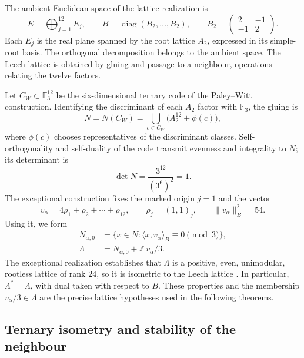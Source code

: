 The ambient Euclidean space of the lattice realization is
\begin{equation}
 E=\bigoplus_{j=1}^{12}E_j,\qquad
 B=\operatorname{diag}(B_2,\ldots,B_2),\qquad
 B_2=\begin{pmatrix}2&-1\\-1&2\end{pmatrix}.
 \label{eq:leech-ambient}
\end{equation}
Each \(E_j\) is the real plane spanned by the root lattice
\(A_2\), expressed in its simple-root basis. The orthogonal
decomposition belongs to the ambient space. The Leech lattice is
obtained by gluing and passage to a neighbour, operations relating
the twelve factors.

Let \(C_W\subset\mathbb F_3^{12}\) be the six-dimensional ternary code
of the Paley--Witt construction. Identifying the discriminant of each
\(A_2\) factor with \(\mathbb F_3\), the gluing is
\[
 N=N(C_W)=
 \bigcup_{c\in C_W}\bigl(A_2^{12}+\phi(c)\bigr),
\]
where \(\phi(c)\) chooses representatives of the discriminant classes.
Self-orthogonality and self-duality of the code transmit evenness and
integrality to \(N\); its determinant is
\[
 \det N=\frac{3^{12}}{(3^6)^2}=1.
\]
The exceptional construction fixes the marked origin \(j=1\) and the
vector
\begin{equation}
 v_\alpha=4\rho_1+\rho_2+\cdots+\rho_{12},
 \qquad \rho_j=(1,1)_j,\qquad
 \|v_\alpha\|_B^2=54.
 \label{eq:leech-marked-vector}
\end{equation}
Using it, we form
\begin{equation}
\begin{split}
 N_{\alpha,0}
  &=\{x\in N:\langle x,v_\alpha\rangle_B\equiv0\pmod3\},\\
 \Lambda&=N_{\alpha,0}+\mathbb Z\,v_\alpha/3.
\end{split}
\label{eq:leech-neighbour}
\end{equation}
The exceptional realization establishes that \(\Lambda\) is a positive,
even, unimodular, rootless lattice of rank \(24\), so it is
isometric to the Leech lattice \cite{HMT-IV}. In particular,
\(\Lambda^*=\Lambda\), with dual taken with respect to \(B\).
These properties and the membership \(v_\alpha/3\in\Lambda\) are the
precise lattice hypotheses used in the following theorems.

\subsection{Ternary isometry and stability of the neighbour}
\label{subsec:leech-c3}

